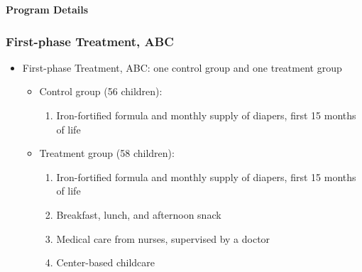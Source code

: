 \documentclass[static]{JJH-Beamer}
\begin{document}
{}
\begin{frame}

\hypertarget{scrambledeggs}{}
\begin{center}
\textbf{Program Details}
\end{center}

\end{frame}

\begin{frame}\label{secondphase}
\frametitle{First-phase Treatment, ABC}

\begin{itemize}
\item First-phase Treatment, ABC: one control group and one treatment group
	\begin{itemize}
	\item Control group (56 children):
		\begin{enumerate}								
		\item Iron-fortified formula and monthly supply of diapers, first 15 months of life
		\end{enumerate}
	\item Treatment group (58 children):
		\begin{enumerate}
		\item Iron-fortified formula and monthly supply of diapers, first 15 months of life
		\item Breakfast, lunch, and afternoon snack
		\item Medical care from nurses, supervised by a doctor
		\item Center-based childcare
		\end{enumerate}
	\end{itemize}			
\end{itemize}

\end{frame}
\end{document}
